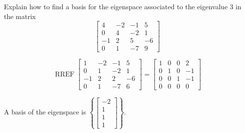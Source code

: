 
\begin{exerciseStatement}


Explain how to find a basis for the eigenspace associated to the eigenvalue \( 3 \) in the matrix \[ \left[\begin{array}{cccc}
4 & -2 & -1 & 5 \\
0 & 4 & -2 & 1 \\
-1 & 2 & 5 & -6 \\
0 & 1 & -7 & 9
\end{array}\right] \]


\end{exerciseStatement}
    
\begin{exerciseAnswer} 


\[\operatorname{RREF} \left[\begin{array}{cccc}
1 & -2 & -1 & 5 \\
0 & 1 & -2 & 1 \\
-1 & 2 & 2 & -6 \\
0 & 1 & -7 & 6
\end{array}\right] = \left[\begin{array}{cccc}
1 & 0 & 0 & 2 \\
0 & 1 & 0 & -1 \\
0 & 0 & 1 & -1 \\
0 & 0 & 0 & 0
\end{array}\right] \]



A basis of the eigenspace is \( \left\{ \left[\begin{array}{c}
-2 \\
1 \\
1 \\
1
\end{array}\right] \right\} \).


\end{exerciseAnswer}
    
